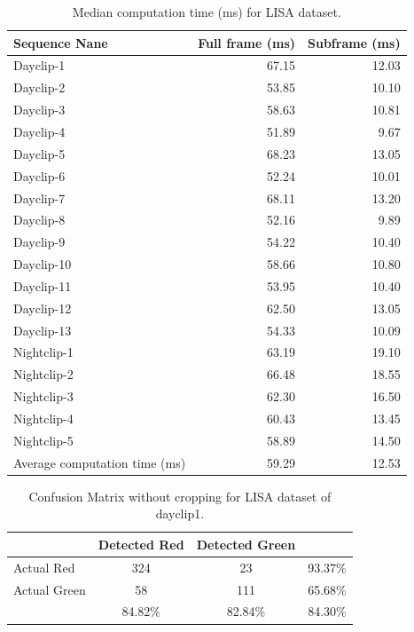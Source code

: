 \begin{table}[!ht]
  \centering
  \caption{Median computation time (ms) for LISA dataset.}
  \label{t:lisa_time}
  \begin{tabular}{  l   r   r }
    \rowcolor{gray!50}
    Sequence Nane &  Full frame (ms)  &  Subframe (ms) \\
    \hline
    Dayclip-1 & 67.15 & 12.03 \\
    Dayclip-2 & 53.85 & 10.10 \\
    Dayclip-3 & 58.63 & 10.81 \\
    Dayclip-4 & 51.89 & 9.67 \\
    Dayclip-5 & 68.23 & 13.05 \\
    Dayclip-6 & 52.24 & 10.01 \\
    Dayclip-7 & 68.11  & 13.20 \\
    Dayclip-8 & 52.16  & 9.89  \\
    Dayclip-9 & 54.22  & 10.40  \\
    Dayclip-10 & 58.66 & 10.80 \\
    Dayclip-11 & 53.95 & 10.40 \\
    Dayclip-12 & 62.50  & 13.05 \\
    Dayclip-13 & 54.33 & 10.09 \\
    Nightclip-1 & 63.19 & 19.10 \\
    Nightclip-2 & 66.48 & 18.55 \\
    Nightclip-3 & 62.30 & 16.50 \\
    Nightclip-4 & 60.43 & 13.45 \\
    Nightclip-5 & 58.89 & 14.50 \\
    \hline
    Average computation time (ms) & 59.29 & 12.53 \\
    
  \end{tabular}
\end{table}

\begin{table}[h!]
  \centering
  \caption{Confusion Matrix without cropping for LISA dataset of dayclip1.}
  \label{t:con_nocrp}
  \begin{tabular}{  l | c | c | r }
   
     & Detected Red & Detected Green &  \\
    \hline
    Actual Red & 324 & 23 & 93.37\% \\
    \hline
    Actual Green & 58 & 111 & 65.68\% \\
    \hline
    & 84.82\% & 82.84\% & 84.30\% \\
    
  \end{tabular}
\end{table}

